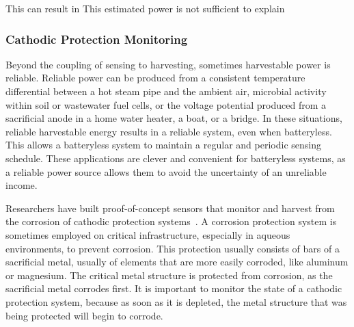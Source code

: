 This can result in 
This estimated power is not sufficient to explain

\subsubsection{Cathodic Protection Monitoring}
Beyond the coupling of sensing to harvesting, sometimes harvestable power is reliable. 
Reliable power can be produced from a consistent temperature differential between a hot steam pipe and the ambient air, microbial activity within soil or wastewater fuel cells, or the voltage potential produced from a sacrificial anode in a home water heater, a boat, or a bridge.
In these situations, reliable harvestable energy results in a reliable system, even when batteryless.
This allows a batteryless system to maintain a regular and periodic sensing schedule.
These applications are clever and convenient for batteryless systems, as a reliable power source allows them to avoid the uncertainty of an unreliable income. 

Researchers have built proof-of-concept sensors that monitor and harvest from the corrosion of cathodic protection systems~\cite{jagtap2021repurposing}.
A corrosion protection system is sometimes employed on critical infrastructure, especially in aqueous environments, to prevent corrosion.
This protection usually consists of bars of a sacrificial metal, usually of elements that are more easily corroded, like aluminum or magnesium. 
The critical metal structure is protected from corrosion, as the sacrificial metal corrodes first.
It is important to monitor the state of a cathodic protection system, because as soon as it is depleted, the metal structure that was being protected will begin to corrode.


